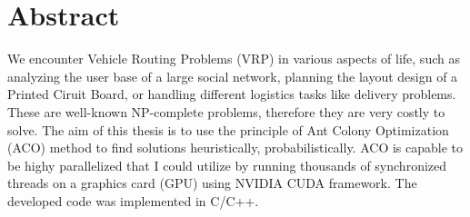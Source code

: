 \chapter*{Abstract}

We encounter Vehicle Routing Problems (VRP) in various aspects of life, such as analyzing the user base of a large social network, planning the layout design of a Printed Ciruit Board, or handling different logistics tasks like delivery problems. These are well-known NP-complete problems, therefore they are very costly to solve. The aim of this thesis is to use the principle of Ant Colony Optimization (ACO) method to find solutions heuristically, probabilistically. ACO is capable to be highy parallelized that I could utilize by running thousands of synchronized threads on a graphics card (GPU) using NVIDIA CUDA framework. The developed code was implemented in C/C++.


\vfill
\selectthesislanguage

\setcounter{romanPage}{\value{page}}
